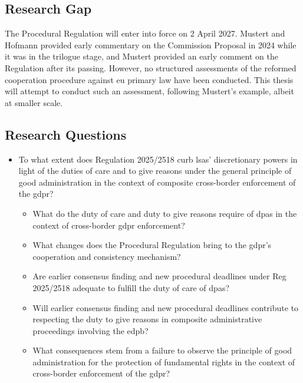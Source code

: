 \subsection{Research Gap}
\label{sec:ch1-research-gap}
The Procedural Regulation will enter into force on 2 April 2027.\autocite[37]{ProceduralRegulation}
Mustert and Hofmann provided early commentary on the Commission Proposal in 2024 while it was in the trilogue stage,\autocite{hofmannFutureGDPREnforcement2024} and Mustert provided an early comment on the Regulation after its passing.\autocite{mustertProceduralisingEnforcement2026} 
However, no structured assessments of the reformed cooperation procedure against \gls{eu} primary law have been conducted. 
This thesis will attempt to conduct such an assessment, following Mustert's example,\autocite{mustertCrossborderEnforcementGDPR} albeit at smaller scale.

\subsection{Research Questions}
\label{sec:ch1-research-questions}
\begin{itemize}
    \item To what extent does Regulation 2025/2518 curb \glspl{lsa}' discretionary powers in light of the duties of care and to give reasons under the general principle of good administration in the context of composite cross-border enforcement of the \gls{gdpr}?
    \begin{itemize}
        \item What do the duty of care and duty to give reasons require of \glspl{dpa} in the context of cross-border \gls{gdpr} enforcement?
        \item What changes does the Procedural Regulation bring to the \gls{gdpr}'s cooperation and consistency mechanism?
        \item Are earlier consensus finding and new procedural deadlines under Reg 2025/2518 adequate to fulfill the duty of care of \glspl{dpa}?
        \item Will earlier consensus finding and new procedural deadlines contribute to respecting the duty to give reasons in composite administrative proceedings involving the \gls{edpb}?
        \item What consequences stem from a failure to observe the principle of good administration for the protection of fundamental rights in the context of cross-border enforcement of the \gls{gdpr}?
    \end{itemize}
\end{itemize}

